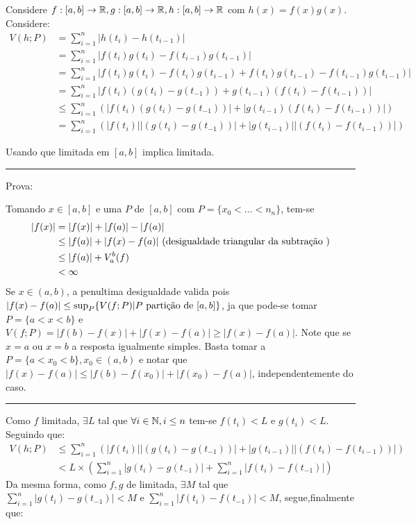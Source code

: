 Considere $f:[a,b]\rightarrow\R, g:[a,b]\rightarrow\R, h:[a,b]\rightarrow\R$ com $h(x) = f(x)g(x)$. Considere:
\begin{align*}
	V(h;P) &= \sum_{i = 1}^n|h(t_i) - h(t_{i-1})| \\
	&= \sum_{i = 1}^n|f(t_i)g(t_i) - f(t_{i-1})g(t_{i-1})| \\
	&= \sum_{i = 1}^n|f(t_i)g(t_i) - f(t_i)g(t_{i-1}) + f(t_i)g(t_{i-1}) - f(t_{i-1})g(t_{i-1})| \\
	&= \sum_{i = 1}^n|f(t_i)(g(t_i) - g(t_{-1})) + g(t_{i-1})(f(t_i) - f(t_{i-1}))| \\
	&\leq \sum_{i = 1}^n(|f(t_i)(g(t_i) - g(t_{-1}))| + |g(t_{i-1})(f(t_i) - f(t_{i-1}))|) \\
	&= \sum_{i = 1}^n(|f(t_i)||(g(t_i) - g(t_{-1}))| + |g(t_{i-1})||(f(t_i) - f(t_{i-1}))|)
\end{align*}

Usando que \variacao limitada em $[a,b]$ implica \funcao limitada.

\vspace{1cm}
\hrule
\vspace{1cm}

Prova:

Tomando $x \in [a,b]$ e uma \particao $P$ de $[a,b]$ com $P = \{x_0 < \ldots < n_n\}$, tem-se
\begin{align*}
	|f(x)| &= |f(x)| + |f(a)| - |f(a)| \\
	&\leq |f(a)| + |f(x) - f(a)| \text{ (desigualdade triangular da \subtracao)} \\
	&\leq |f(a)| + V_a^b(f) \\
	&< \infty
\end{align*}
Se $x \in (a,b)$, a penultima desigualdade \eh valida pois $|f(x) - f(a)| \leq \sup_P\{V(f;P) | P \text{ \particao de } [a,b]\}$,
ja que pode-se tomar \particao $P = \{a < x <b\}$ e $V(f;P) = |f(b) - f(x)| + |f(x) - f(a)| \ge |f(x) - f(a)|$. Note que se $x = a$ ou $x=b$ a resposta \eh igualmente simples. Basta tomar a \particao $P=\{a < x_0 < b\}, x_0 \in (a,b)$ e notar que $|f(x) - f(a)| \leq |f(b) - f(x_0)| + |f(x_0) - f(a)|$, independentemente do caso.

\vspace{1cm}
\hrule
\vspace{1cm}


Como $f$ limitada, $\exists L$ tal que $\forall i \in \N, i \leq n$ tem-se $f(t_i) < L$ e $g(t_i) < L$. Seguindo \entao que:
\begin{align*}
	V(h;P) &\leq \sum_{i = 1}^n(|f(t_i)||(g(t_i) - g(t_{-1}))| + |g(t_{i-1})||(f(t_i) - f(t_{i-1}))|) \\
	&< L\times ( \sum_{i = 1}^n|g(t_i) - g(t_{-1})| + \sum_{i = 1}^n|f(t_i) - f(t_{-1})|)
\end{align*}
Da mesma forma, como $f,g$ \sao de \variacao limitada, $\exists M$ tal que $ \sum_{i = 1}^n|g(t_i) - g(t_{-1})| < M$ e $\sum_{i = 1}^n|f(t_i) - f(t_{-1})| < M$, segue,finalmente que:

